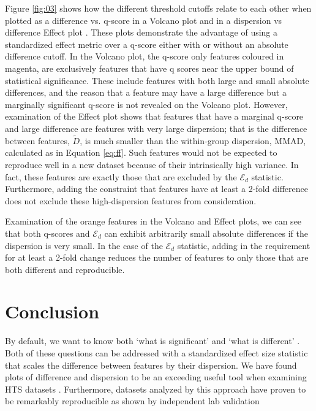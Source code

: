 \documentclass{bioinfo}
\begin{document}
Figure \ref{fig:03} shows how the different threshold cutoffs relate to each other when plotted as a difference vs. q-score in a Volcano plot \citep{Cui:2003aa} and in a dispersion vs difference Effect plot \citep{gloor:effect}. These plots demonstrate the advantage of using a standardized effect metric over a q-score either with or without an absolute difference cutoff. In the Volcano plot, the q-score only features coloured in magenta, are exclusively features that have q scores near the upper bound of statistical significance. These include features with both large and small absolute differences, and the reason that a feature may have a large difference but a marginally significant q-score is not revealed on the Volcano plot. However, examination of the Effect plot shows that features that have a marginal q-score and large difference are features with very large dispersion; that is the difference between features, $\tilde{D}$, is much smaller than the within-group dispersion, MMAD, calculated as in Equation \ref{eq:ff}. Such features would not be expected to reproduce well in a new dataset because of their intrinsically high variance. In fact, these features are exactly those that are excluded by the $\mathcal{E}_{d} $ statistic.  Furthermore, adding the constraint that features have at least a 2-fold difference does not exclude these high-dispersion features from consideration. 

Examination of the orange features in the Volcano and Effect plots, we can see that both q-scores and $\mathcal{E}_{d} $ can exhibit arbitrarily small absolute differences if the dispersion is very small. In the case of the $\mathcal{E}_{d} $ statistic, adding in the requirement for at least a 2-fold change reduces the number of features to only those that are both different and reproducible.  





\section{Conclusion}

By default, we want to know both `what is significant' and `what is different' \citep{Cui:2003aa}.  Both of these questions can be addressed with a standardized effect size statistic that scales the difference between features by their dispersion. We have found plots of difference and dispersion to be an exceeding useful tool when examining HTS datasets \citep{gloor:effect}. Furthermore, datasets analyzed by this approach have proven to be remarkably reproducible as shown by independent lab validation \citep{macklaim:2013, nelson:2015vaginal}
\end{document}
